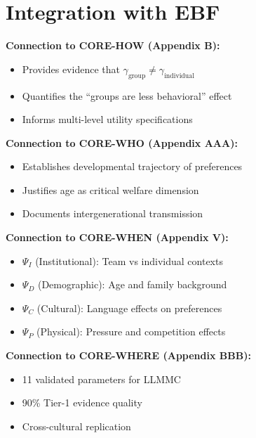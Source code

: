 \section{Integration with EBF}
\label{sec:su-integration}

\begin{tcolorbox}[colback=yellow!5!white, colframe=yellow!75!black,
    title=Integration: LIT-SUTTER $\leftrightarrow$ CORE Appendices]

\textbf{Connection to CORE-HOW (Appendix B):}
\begin{itemize}[nosep]
\item Provides evidence that $\gamma_{\text{group}} \neq \gamma_{\text{individual}}$
\item Quantifies the ``groups are less behavioral'' effect
\item Informs multi-level utility specifications
\end{itemize}

\textbf{Connection to CORE-WHO (Appendix AAA):}
\begin{itemize}[nosep]
\item Establishes developmental trajectory of preferences
\item Justifies age as critical welfare dimension
\item Documents intergenerational transmission
\end{itemize}

\textbf{Connection to CORE-WHEN (Appendix V):}
\begin{itemize}[nosep]
\item $\Psi_I$ (Institutional): Team vs individual contexts
\item $\Psi_D$ (Demographic): Age and family background
\item $\Psi_C$ (Cultural): Language effects on preferences
\item $\Psi_P$ (Physical): Pressure and competition effects
\end{itemize}

\textbf{Connection to CORE-WHERE (Appendix BBB):}
\begin{itemize}[nosep]
\item 11 validated parameters for LLMMC
\item 90\% Tier-1 evidence quality
\item Cross-cultural replication
\end{itemize}

\end{tcolorbox}


